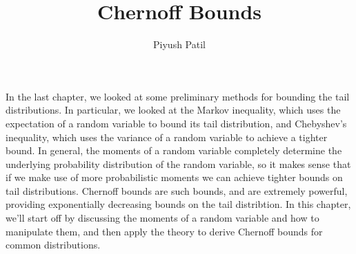 \documentclass{article}
\begin{document}
\title{Chernoff Bounds}
\author{Piyush Patil}
\maketitle

In the last chapter, we looked at some preliminary methods for bounding the tail distributions. In particular, we looked at the Markov inequality, which uses the expectation of a random variable to bound its tail distribution, and Chebyshev's inequality, which uses the variance of a random variable to achieve a tighter bound. In general, the moments of a random variable completely determine the underlying probability distribution of the random variable, so it makes sense that if we make use of more probabilistic moments we can achieve tighter bounds on tail distributions. Chernoff bounds are such bounds, and are extremely powerful, providing exponentially decreasing bounds on the tail distribtion. In this chapter, we'll start off by discussing the moments of a random variable and how to manipulate them, and then apply the theory to derive Chernoff bounds for common distributions.
\end{document}
